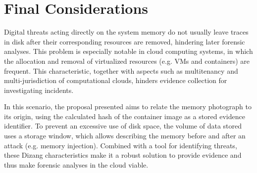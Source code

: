 \documentclass[conference]{IEEEtran}
\newcommand{\fancyname}{Dizang }
\begin{document}
%



\section{Final Considerations}
\label{sec:conclusion}

Digital threats acting directly on the system memory do not usually leave traces in disk after their corresponding resources are removed, hindering later forensic analyses.
%
This problem is especially notable in cloud computing systems, in which the allocation and removal of virtualized resources (e.g. VMs and containers) are frequent.
%
This characteristic, together with aspects such as multitenancy and multi-jurisdiction of computational clouds, hinders evidence collection for investigating incidents.


In this scenario, the proposal presented aims to relate the memory photograph to its origin, using the calculated hash of the container image as a stored evidence identifier.
%
To prevent an excessive use of disk space, the volume of data stored uses a storage window, which allows describing the memory before and after an attack (e.g. memory injection).
%
Combined with a tool for identifying threats, these \fancyname characteristics make it a robust solution to provide evidence and thus make forensic analyses in the cloud viable.
%
\end{document}
